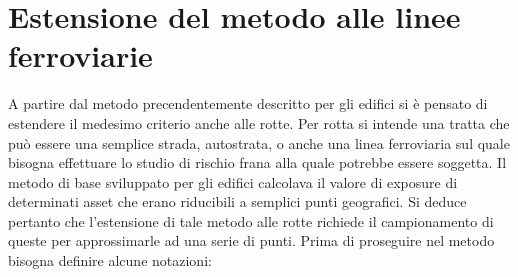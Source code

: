 
\chapter{Estensione del metodo alle linee ferroviarie} %
A partire dal metodo precendentemente descritto per gli edifici si è pensato di estendere il medesimo criterio anche alle rotte. Per rotta si intende una tratta che può essere una semplice strada, autostrata, o anche una linea ferroviaria sul quale bisogna effettuare lo studio di rischio frana alla quale potrebbe essere soggetta. Il metodo di base sviluppato per gli edifici calcolava il valore di exposure di determinati asset che erano riducibili a semplici punti geografici. Si deduce pertanto che l'estensione di tale metodo alle rotte richiede il campionamento di queste per approssimarle ad una serie di punti.
Prima di proseguire nel metodo bisogna definire alcune notazioni:

